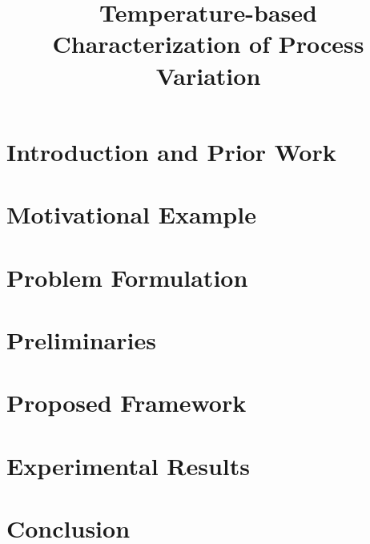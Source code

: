 \documentclass[9pt,conference]{IEEEtran}
\begin{document}
  \title{Temperature-based Characterization of Process Variation}

  \author{
  }

  \maketitle

  \begin{abstract}
    
  \end{abstract}

  \section{Introduction and Prior Work} 
  

  \section{Motivational Example} 
  

  \section{Problem Formulation} 
  

  \section{Preliminaries}  
  

  \section{Proposed Framework} 
  

  \section{Experimental Results} 
  

  \section{Conclusion} 
  

  \begingroup
  \setlength\bibitemsep{2pt}
  \printbibliography
  \endgroup
\end{document}
